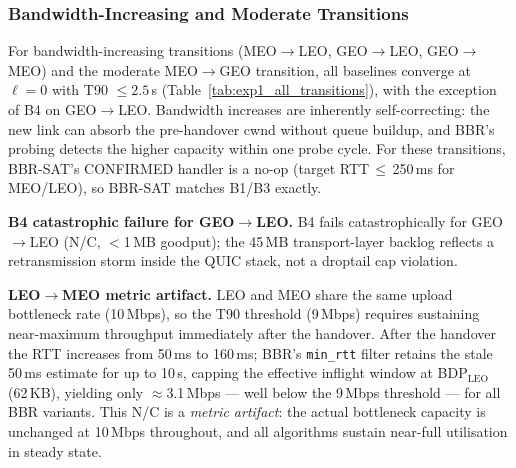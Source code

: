 \documentclass[conference]{IEEEtran}
\begin{document}
\subsubsection{Bandwidth-Increasing and Moderate Transitions}

For bandwidth-increasing transitions (MEO$\to$LEO, GEO$\to$LEO,
GEO$\to$MEO) and the moderate MEO$\to$GEO transition, all baselines
converge at $\ell = 0$ with T90 $\leq 2.5$\,s
(Table~\ref{tab:exp1_all_transitions}), with the exception of B4 on GEO$\to$LEO.
Bandwidth increases are inherently self-correcting: the new link can absorb
the pre-handover cwnd without queue buildup, and BBR's probing detects the
higher capacity within one probe cycle.
For these transitions, BBR-SAT's CONFIRMED handler is a no-op (target
RTT\,$\leq$\,250\,ms for MEO/LEO), so BBR-SAT matches B1/B3 exactly.

\textbf{B4 catastrophic failure for GEO$\to$LEO.}
B4 fails catastrophically for GEO$\to$LEO (N/C, $<$1\,MB goodput); the 45\,MB transport-layer backlog reflects a retransmission storm inside the QUIC stack, not a droptail cap violation.

\textbf{LEO$\to$MEO metric artifact.}
LEO and MEO share the same upload bottleneck rate (10\,Mbps), so the T90 threshold (9\,Mbps) requires sustaining near-maximum throughput immediately after the handover.
After the handover the RTT increases from 50\,ms to 160\,ms; BBR's \texttt{min\_rtt} filter retains the stale 50\,ms estimate for up to 10\,s, capping the effective inflight window at BDP$_\mathrm{LEO}$ (62\,KB), yielding only $\approx$3.1\,Mbps --- well below the 9\,Mbps threshold --- for all BBR variants.
This N/C is a \emph{metric artifact}: the actual bottleneck capacity is unchanged at 10\,Mbps throughout, and all algorithms sustain near-full utilisation in steady state.
\end{document}

